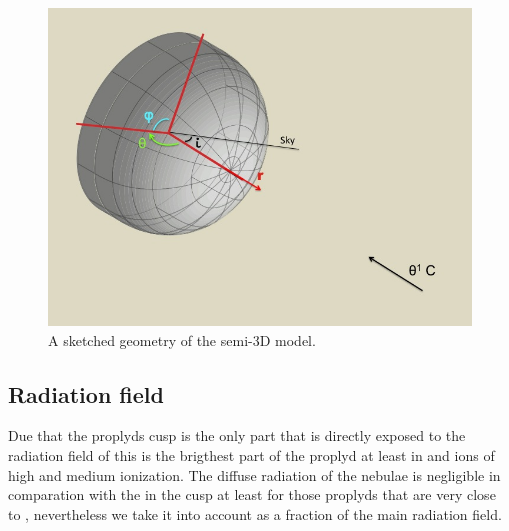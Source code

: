 \documentclass[aaspp]{article}
\begin{document}
\begin{figure}[h]
  \centering
  \includegraphics[width=8.5 cm]{./graf_model_3D/geometry_model.jpg}
  \caption{A sketched geometry of the semi-3D model.} \label{fig:3Dgeom}
\end{figure}

\subsection{Radiation field}
\label{sec:radiation}

Due that the proplyds cusp is the only part that is directly exposed to the radiation field of \tc this is the brigthest part of the proplyd at least in \ha and ions of high and medium ionization. The diffuse radiation of the nebulae is negligible in comparation with the \tc in the cusp at least for those proplyds that are very close to \tc, nevertheless we take it into account as a fraction of the main radiation field.
\end{document}
